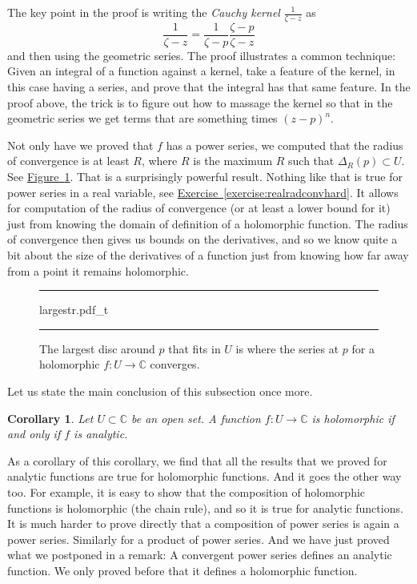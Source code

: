 \documentclass[12pt,openany]{book}
\newcommand{\C}{{\mathbb{C}}}
\newcommand{\myindex}[1]{#1\index{#1}}
\theoremstyle{plain}
\newtheorem{cor}[thm]{Corollary}
\theoremstyle{remark}
\theoremstyle{definition}
\newenvironment{myfig}{%
\begin{figure}[h!t]
\noindent\rule{\textwidth}{0.5pt}\vspace{12pt}\par\centering}%
{\par\noindent\rule{\textwidth}{0.5pt}
\end{figure}}
\theoremstyle{exercise}
\theoremstyle{example}
\newcommand{\figureref}[1]{\hyperref[#1]{Figure~\ref*{#1}}}
\newcommand{\exerciseref}[1]{\hyperref[#1]{Exercise~\ref*{#1}}}
\begin{document}
The key point in the proof is writing the \emph{\myindex{Cauchy kernel}}
$\frac{1}{\zeta-z}$ as
\begin{equation*}
\frac{1}{\zeta-z}
=
\frac{1}{\zeta-p}
\frac{\zeta-p}{\zeta-z}
\end{equation*}
and then using the geometric series.
The proof illustrates a common technique:
Given an
integral of a function against a kernel,
take a feature of the kernel, in this case having a series, and prove that the
integral has that same feature.  In the proof above, the trick is to figure out
how to massage the kernel so that in the geometric series we get terms
that are something times ${(z-p)}^n$.

Not only have we proved
that $f$ has a power series, we computed
that the radius of convergence is at least $R$, where $R$ is the maximum $R$
such that $\Delta_R(p) \subset U$.  See \figureref{fig:largestr}.
That is a surprisingly powerful result.
Nothing like that is true for power series in a real variable,
see \exerciseref{exercise:realradconvhard}.
It allows for computation of the radius of convergence (or at least a lower
bound for it) just from knowing the 
domain of definition of a holomorphic function.  The radius of convergence
then gives us bounds on the derivatives, and so we know quite a bit about
the size of the derivatives of a function just from knowing how far away from a point it
remains holomorphic.

\begin{myfig}
{largestr.pdf_t}
\caption{The largest disc around $p$ that fits in $U$
is where the series at $p$
for a holomorphic $f \colon U \to \C$ converges.%
\label{fig:largestr}}
\end{myfig}

\pagebreak[2]
Let us state the main conclusion of this subsection once more.

\begin{cor}
Let $U \subset \C$ be an open set.  A function $f \colon U \to \C$
is holomorphic if and only if $f$ is analytic.
\end{cor}

As a corollary of this corollary, we find that all the results that we proved
for analytic functions are true for holomorphic functions.  And it goes the
other way too.  For example, it is easy to show that the composition of
holomorphic functions is holomorphic (the chain rule), and
so it is true for analytic functions.
It is much harder to prove directly that a composition of power series
is again a power series.
Similarly for a product of power series.
And we have just proved what we postponed in a remark: A convergent power
series defines an analytic function.  We only proved before that it defines
a holomorphic function.
\end{document}
